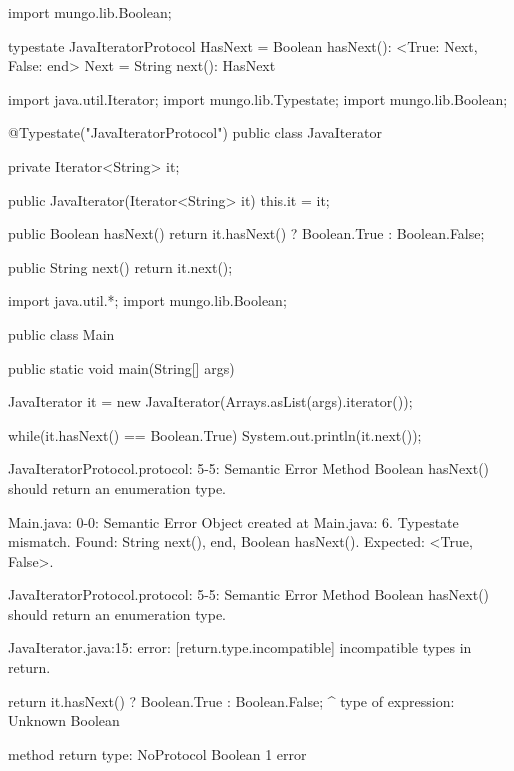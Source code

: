 \begin{code}
import mungo.lib.Boolean;

typestate JavaIteratorProtocol {
  HasNext = {
    Boolean hasNext(): <True: Next, False: end>
  }
  Next = {
    String next(): HasNext
  }
}\end{code}

\begin{code}
import java.util.Iterator;
import mungo.lib.Typestate;
import mungo.lib.Boolean;

@Typestate("JavaIteratorProtocol")
public class JavaIterator {

  private Iterator<String> it;

  public JavaIterator(Iterator<String> it) {
    this.it = it;
  }

	public Boolean hasNext() {
    return it.hasNext() ? Boolean.True : Boolean.False;
  }

  public String next() {
    return it.next();
  }

}\end{code}

\begin{code}
import java.util.*;
import mungo.lib.Boolean;

public class Main {
	public static void main(String[] args) {
		JavaIterator it = new JavaIterator(Arrays.asList(args).iterator());
    
    while(it.hasNext() == Boolean.True){
      System.out.println(it.next());
    }
	}
}\end{code}

\lstset{language=,caption=Mungo's output}
\begin{code}

JavaIteratorProtocol.protocol: 5-5: Semantic Error
		Method Boolean hasNext() should return an enumeration type.

Main.java: 0-0: Semantic Error
		Object created at Main.java: 6. Typestate mismatch. Found: String next(), end, Boolean hasNext(). Expected: <True, False>.

JavaIteratorProtocol.protocol: 5-5: Semantic Error
		Method Boolean hasNext() should return an enumeration type.
\end{code}

\lstset{language=,caption=Our tool's output}
\begin{code}
JavaIterator.java:15: error: [return.type.incompatible] incompatible types in return.

    return it.hasNext() ? Boolean.True : Boolean.False;
                        ^
  type of expression: Unknown Boolean

  method return type: NoProtocol Boolean
1 error
\end{code}

